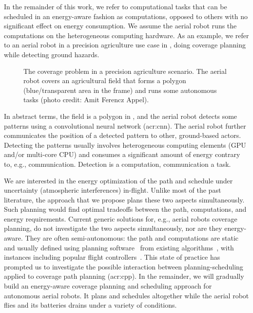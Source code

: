 In the remainder of this work, we refer to computational tasks that can be scheduled in an energy-aware fashion as computations, opposed to others with no significant effect on energy consumption. We assume the aerial robot runs the computations on the heterogeneous computing hardware. As an example, we refer to an aerial robot in a precision agriculture use case in , doing coverage planning while detecting ground hazards. 
\begin{figure}[h!]
  \centering
  
  \caption[The coverage problem in a precision agriculture scenario]{The coverage problem in a precision agriculture scenario. The aerial robot covers an agricultural field that forms a polygon (blue/transparent area in the frame) and runs some autonomous tasks {\scriptsize(photo credit: Amit Ferencz Appel)}.}
  \label{fig:plot2}
\end{figure}
In abstract terms, the field is a polygon in , and the aerial robot detects some patterns using a convolutional neural network (\Gls{acr:cnn}). The aerial robot further communicates the position of a detected pattern to other, ground-based actors. Detecting the patterns usually involves heterogeneous computing elements (GPU and/or multi-core CPU) and consumes a significant amount of energy contrary to, e.g., communication. Detection is a computation, communication a task.

We are interested in the energy optimization of the path and schedule under uncertainty (atmospheric interferences) in-flight. Unlike most of the past literature, the approach that we propose plans these two aspects simultaneously. Such planning would find optimal tradeoffs between the path, computations, and energy requirements. Current generic solutions for, e.g., aerial robots coverage planning, do not investigate the two aspects simultaneously, nor are they energy-aware. They are often semi-autonomous: the path and computations are static and usually defined using planning software~\citep{daponte2019review} from existing algorithms~\citep{choset2001coverage,galceran2013survey}, with instances including popular flight controllers~\citep{px4,papa}. This state of practice has prompted us to investigate the possible interaction between planning-scheduling applied to coverage path planning (\Gls{acr:cpp}). In the remainder, we will gradually build an energy-aware coverage planning and scheduling approach for autonomous aerial robots. It plans and schedules altogether while the aerial robot flies and its batteries drains under a variety of conditions.


